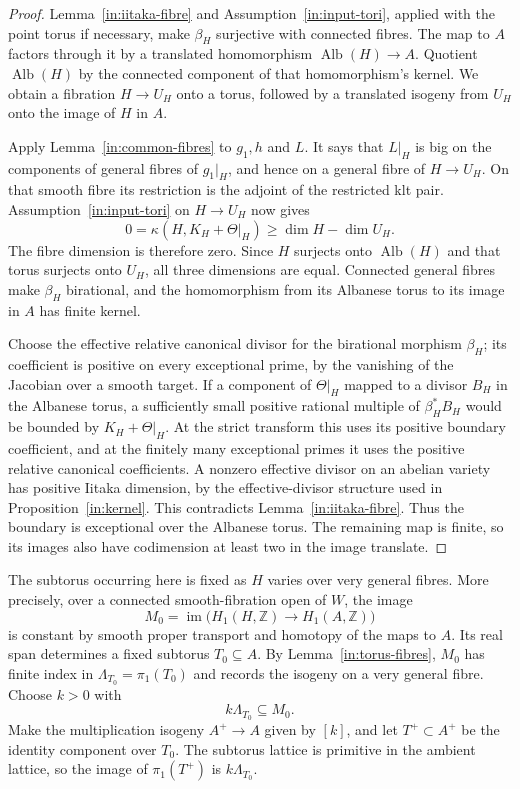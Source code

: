\begin{proof}
Lemma~\ref{in:iitaka-fibre} and
Assumption~\ref{in:input-tori}, applied with the point torus if
necessary, make $\beta_H$ surjective with connected fibres.
The map to $A$ factors through it by a translated homomorphism
$\operatorname{Alb}(H)\to A$.  Quotient $\operatorname{Alb}(H)$
by the connected component of that homomorphism's kernel.  We obtain
a fibration $H\to U_H$ onto a torus, followed by a translated
isogeny from $U_H$ onto the image of $H$ in $A$.

Apply Lemma~\ref{in:common-fibres} to $g_1,h$ and $L$.  It says
that $L|_H$ is big on the components of general fibres of $g_1|_H$,
and hence on a general fibre of $H\to U_H$.  On that smooth fibre
its restriction is the adjoint of the restricted klt pair.
Assumption~\ref{in:input-tori} on $H\to U_H$ now gives
\[
 0=\kappa(H,K_H+\Theta|_H)
 \ge\dim H-\dim U_H.
\]
The fibre dimension is therefore zero.  Since $H$ surjects onto
$\operatorname{Alb}(H)$ and that torus surjects onto $U_H$, all
three dimensions are equal.  Connected general fibres make
$\beta_H$ birational, and the homomorphism from its Albanese torus
to its image in $A$ has finite kernel.

Choose the effective relative canonical divisor for the birational
morphism $\beta_H$; its coefficient is positive on every exceptional
prime, by the vanishing of the Jacobian over a smooth target.  If a
component of $\Theta|_H$ mapped to a divisor $B_H$ in the Albanese
torus, a sufficiently small positive rational multiple of
$\beta_H^*B_H$ would be bounded by $K_H+\Theta|_H$.  At the strict
transform this uses its positive boundary coefficient, and at the
finitely many exceptional primes it uses the positive relative
canonical coefficients.  A nonzero effective divisor on an abelian
variety has positive Iitaka dimension, by the effective-divisor
structure used in Proposition~\ref{in:kernel}.  This contradicts
Lemma~\ref{in:iitaka-fibre}.  Thus the boundary is exceptional over
the Albanese torus.  The remaining map is finite, so its images also
have codimension at least two in the image translate.
\end{proof}

The subtorus occurring here is fixed as $H$ varies over very general
fibres.  More precisely, over a connected smooth-fibration open of
$W$, the image
\[
 M_0=\operatorname{im}\bigl(H_1(H,\mathbb Z)\longrightarrow
 H_1(A,\mathbb Z)\bigr)
\]
is constant by smooth proper transport and homotopy of the maps to
$A$.  Its real span determines a fixed subtorus $T_0\subseteq A$.
By Lemma~\ref{in:torus-fibres}, $M_0$ has finite index in
$\Lambda_{T_0}=\pi_1(T_0)$ and records the isogeny on a very general
fibre.  Choose $k>0$ with
\[
 k\Lambda_{T_0}\subseteq M_0.
\]
Make the multiplication isogeny $A^+\to A$ given by $[k]$, and let
$T^+\subset A^+$ be the identity component over $T_0$.  The
subtorus lattice is primitive in the ambient lattice, so the image
of $\pi_1(T^+)$ is $k\Lambda_{T_0}$.

